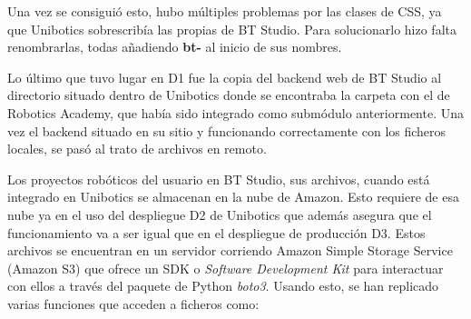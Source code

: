 Una vez se consiguió esto, hubo múltiples problemas por las clases de CSS, ya que Unibotics sobrescribía las propias de BT Studio. Para solucionarlo hizo falta renombrarlas, todas añadiendo \textbf{bt-} al inicio de sus nombres. 

Lo último que tuvo lugar en D1 fue la copia del backend web de BT Studio al directorio situado dentro de Unibotics donde se encontraba la carpeta con el de Robotics Academy, que había sido integrado como submódulo anteriormente. Una vez el backend situado en su sitio y funcionando correctamente con los ficheros locales, se pasó al trato de archivos en remoto.

Los proyectos robóticos del usuario en BT Studio, sus archivos, cuando está integrado en Unibotics se almacenan en la nube de Amazon. Esto requiere de esa nube ya en el uso del despliegue D2 de Unibotics que además asegura que el funcionamiento va a ser igual que en el despliegue de producción D3. Estos archivos se encuentran en un servidor corriendo Amazon Simple Storage Service (Amazon S3) que ofrece un SDK o \textit{Software Development Kit} para interactuar con ellos a través del paquete de Python \textit{boto3}. Usando esto, se han replicado varias funciones que acceden a ficheros como:

